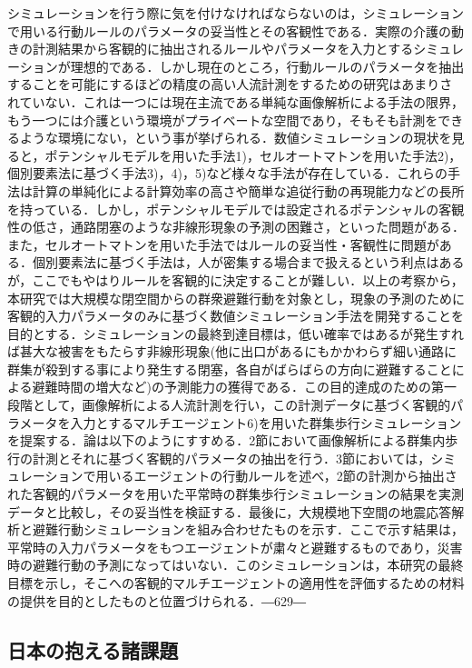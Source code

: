 シミュレーションを行う際に気を付けなければならないのは，シミュレーションで用いる行動ルールのパラメータの妥当性とその客観性である．実際の介護の動きの計測結果から客観的に抽出されるルールやパラメータを入力とするシミュレーションが理想的である．しかし現在のところ，行動ルールのパラメータを抽出することを可能にするほどの精度の高い人流計測をするための研究はあまりされていない．これは一つには現在主流である単純な画像解析による手法の限界，もう一つには介護という環境がプライベートな空間であり，そもそも計測をできるような環境にない，という事が挙げられる．数値シミュレーションの現状を見ると，ポテンシャルモデルを用いた手法1)，セルオートマトンを用いた手法2)，個別要素法に基づく手法3)，4)，5)など様々な手法が存在している．これらの手法は計算の単純化による計算効率の高さや簡単な追従行動の再現能力などの長所を持っている．しかし，ポテンシャルモデルでは設定されるポテンシャルの客観性の低さ，通路閉塞のような非線形現象の予測の困難さ，といった問題がある．また，セルオートマトンを用いた手法ではルールの妥当性・客観性に問題がある．個別要素法に基づく手法は，人が密集する場合まで扱えるという利点はあるが，ここでもやはりルールを客観的に決定することが難しい．以上の考察から，本研究では大規模な閉空間からの群衆避難行動を対象とし，現象の予測のために客観的入力パラメータのみに基づく数値シミュレーション手法を開発することを目的とする．シミュレーションの最終到達目標は，低い確率ではあるが発生すれば甚大な被害をもたらす非線形現象(他に出口があるにもかかわらず細い通路に群集が殺到する事により発生する閉塞，各自がばらばらの方向に避難することによる避難時間の増大など)の予測能力の獲得である．この目的達成のための第一段階として，画像解析による人流計測を行い，この計測データに基づく客観的パラメータを入力とするマルチエージェント6)を用いた群集歩行シミュレーションを提案する．論は以下のようにすすめる．2節において画像解析による群集内歩行の計測とそれに基づく客観的パラメータの抽出を行う．3節においては，シミュレーションで用いるエージェントの行動ルールを述べ，2節の計測から抽出された客観的パラメータを用いた平常時の群集歩行シミュレーションの結果を実測データと比較し，その妥当性を検証する．最後に，大規模地下空間の地震応答解析と避難行動シミュレーションを組み合わせたものを示す．ここで示す結果は，平常時の入力パラメータをもつエージェントが粛々と避難するものであり，災害時の避難行動の予測になってはいない．このシミュレーションは，本研究の最終目標を示し，そこへの客観的マルチエージェントの適用性を評価するための材料の提供を目的としたものと位置づけられる．―629―


\subsection{日本の抱える諸課題}

